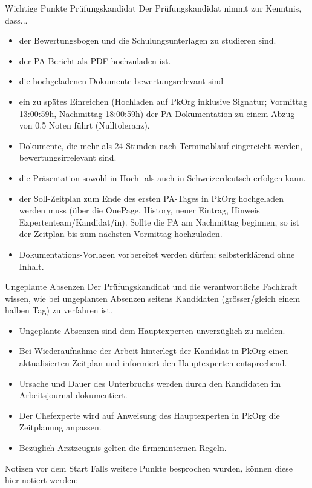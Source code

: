 \begin{taskitemwithoutcomment}{Wichtige Punkte Prüfungskandidat}
Der Prüfungskandidat nimmt zur Kenntnis, dass...
\begin{itemize}
    \item der Bewertungsbogen und die Schulungsunterlagen zu studieren sind.
    \item der PA-Bericht als PDF hochzuladen ist.
    \item die hochgeladenen Dokumente bewertungsrelevant sind
    \item ein zu spätes Einreichen (Hochladen auf PkOrg inklusive Signatur; Vormittag 13:00:59h, Nachmittag 18:00:59h)
          der PA-Dokumentation zu einem Abzug von 0.5 Noten führt (Nulltoleranz).
    \item Dokumente, die mehr als 24 Stunden nach Terminablauf eingereicht werden, bewertungsirrelevant sind.
    \item die Präsentation sowohl in Hoch- als auch in Schweizerdeutsch erfolgen kann.
    \item der Soll-Zeitplan zum Ende des ersten PA-Tages in PkOrg hochgeladen
          werden muss (über die OnePage, History, neuer Eintrag, Hinweis
          Expertenteam/Kandidat/in). Sollte die PA am Nachmittag beginnen, so ist der
          Zeitplan bis zum nächsten Vormittag hochzuladen.
    \item Dokumentations-Vorlagen vorbereitet werden dürfen; selbsterklärend ohne
          Inhalt.
\end{itemize}
\end{taskitemwithoutcomment}

\begin{taskitemwithoutcomment}{Ungeplante Absenzen}
Der Prüfungskandidat und die verantwortliche Fachkraft wissen, wie bei
ungeplanten Absenzen seitens Kandidaten (grösser/gleich einem halben Tag) zu
verfahren ist.
\begin{itemize}
    \item Ungeplante Absenzen sind dem Hauptexperten unverzüglich zu melden.
    \item Bei Wiederaufnahme der Arbeit hinterlegt der Kandidat in PkOrg einen
          aktualisierten Zeitplan und informiert den Hauptexperten entsprechend.
    \item Ursache und Dauer des Unterbruchs werden durch den Kandidaten im
          Arbeitsjournal dokumentiert.
    \item Der Chefexperte wird auf Anweisung des Hauptexperten in PkOrg die
          Zeitplanung anpassen.
    \item Bezüglich Arztzeugnis gelten die firmeninternen Regeln.
\end{itemize}
\end{taskitemwithoutcomment}

\begin{taskitem}{Notizen vor dem Start}
Falls weitere Punkte besprochen wurden, können diese hier notiert werden:
\end{taskitem}

\clearpage
